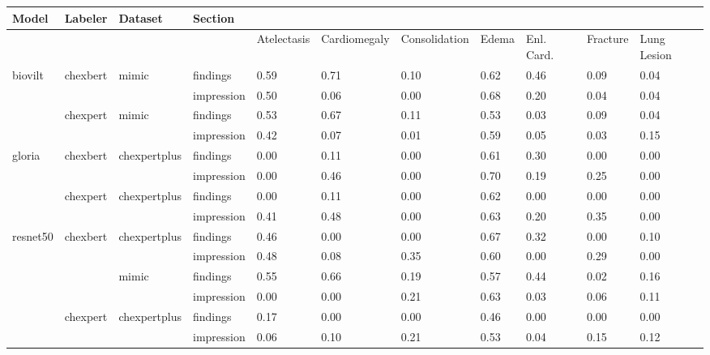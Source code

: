 \begin{tabular}{lllllllllll}
\toprule
Model & Labeler & Dataset & Section &  &  &  &  &  &  &  \\
\midrule
 &  &  &  & Atelectasis & Cardiomegaly & Consolidation & Edema & Enl. Card. & Fracture & Lung Lesion \\
\cmidrule(lr){1-11} \cmidrule(lr){2-11} \cmidrule(lr){3-11}
\multirow[t]{4}{*}{biovilt} & \multirow[t]{2}{*}{chexbert} & \multirow[t]{2}{*}{mimic} & findings & 0.59 & 0.71 & 0.10 & 0.62 & 0.46 & 0.09 & 0.04 \\
 &  &  & impression & 0.50 & 0.06 & 0.00 & 0.68 & 0.20 & 0.04 & 0.04 \\
\cmidrule(lr){2-11} \cmidrule(lr){3-11}
 & \multirow[t]{2}{*}{chexpert} & \multirow[t]{2}{*}{mimic} & findings & 0.53 & 0.67 & 0.11 & 0.53 & 0.03 & 0.09 & 0.04 \\
 &  &  & impression & 0.42 & 0.07 & 0.01 & 0.59 & 0.05 & 0.03 & 0.15 \\
\cmidrule(lr){1-11} \cmidrule(lr){2-11} \cmidrule(lr){3-11}
\multirow[t]{4}{*}{gloria} & \multirow[t]{2}{*}{chexbert} & \multirow[t]{2}{*}{chexpertplus} & findings & 0.00 & 0.11 & 0.00 & 0.61 & 0.30 & 0.00 & 0.00 \\
 &  &  & impression & 0.00 & 0.46 & 0.00 & 0.70 & 0.19 & 0.25 & 0.00 \\
\cmidrule(lr){2-11} \cmidrule(lr){3-11}
 & \multirow[t]{2}{*}{chexpert} & \multirow[t]{2}{*}{chexpertplus} & findings & 0.00 & 0.11 & 0.00 & 0.62 & 0.00 & 0.00 & 0.00 \\
 &  &  & impression & 0.41 & 0.48 & 0.00 & 0.63 & 0.20 & 0.35 & 0.00 \\
\cmidrule(lr){1-11} \cmidrule(lr){2-11} \cmidrule(lr){3-11}
\multirow[t]{8}{*}{resnet50} & \multirow[t]{4}{*}{chexbert} & \multirow[t]{2}{*}{chexpertplus} & findings & 0.46 & 0.00 & 0.00 & 0.67 & 0.32 & 0.00 & 0.10 \\
 &  &  & impression & 0.48 & 0.08 & 0.35 & 0.60 & 0.00 & 0.29 & 0.00 \\
\cmidrule(lr){3-11}
 &  & \multirow[t]{2}{*}{mimic} & findings & 0.55 & 0.66 & 0.19 & 0.57 & 0.44 & 0.02 & 0.16 \\
 &  &  & impression & 0.00 & 0.00 & 0.21 & 0.63 & 0.03 & 0.06 & 0.11 \\
\cmidrule(lr){2-11} \cmidrule(lr){3-11}
 & \multirow[t]{4}{*}{chexpert} & \multirow[t]{2}{*}{chexpertplus} & findings & 0.17 & 0.00 & 0.00 & 0.46 & 0.00 & 0.00 & 0.00 \\
 &  &  & impression & 0.06 & 0.10 & 0.21 & 0.53 & 0.04 & 0.15 & 0.12 \\

\end{tabular}
